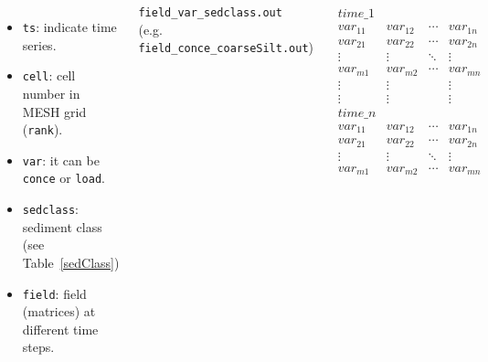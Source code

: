\documentclass{beamer}
\begin{document}
\begin{frame}
\begin{columns}
{\begin{itemize}
\item \texttt{ts}: indicate time series.
\item \texttt{cell}: cell number in MESH grid (\texttt{rank}).
\item \texttt{var}: it can be \texttt{conce} or \texttt{load}.
\item \texttt{sedclass}: sediment class (see Table~\ref{sedClass})
\item \texttt{field}: field (matrices) at different time steps.
\end{itemize}
}
{\tiny
\begin{center}
\texttt{field\_var\_sedclass.out}\\
(e.g. \texttt{field\_conce\_coarseSilt.out})
\end{center}
\vspace*{-7mm}
\begin{minipage}[t]{\linewidth}
$$
\begin{matrix}
time\_1 &  & &  \\
var_{11} & var_{12} & \cdots & var_{1n} \\
var_{21} & var_{22} & \cdots & var_{2n} \\
\vdots & \vdots & \ddots & \vdots \\
var_{m1} & var_{m2} & \cdots & var_{mn}\\
\vdots & \vdots &  & \vdots \\
\vdots & \vdots &  & \vdots \\
time\_n &  & &  \\
var_{11} & var_{12} & \cdots & var_{1n} \\
var_{21} & var_{22} & \cdots & var_{2n} \\
\vdots & \vdots & \ddots & \vdots \\
var_{m1} & var_{m2} & \cdots & var_{mn}\\
\end{matrix}
$$
\end{minipage}
}
\end{columns}
\end{frame}
\end{document}

